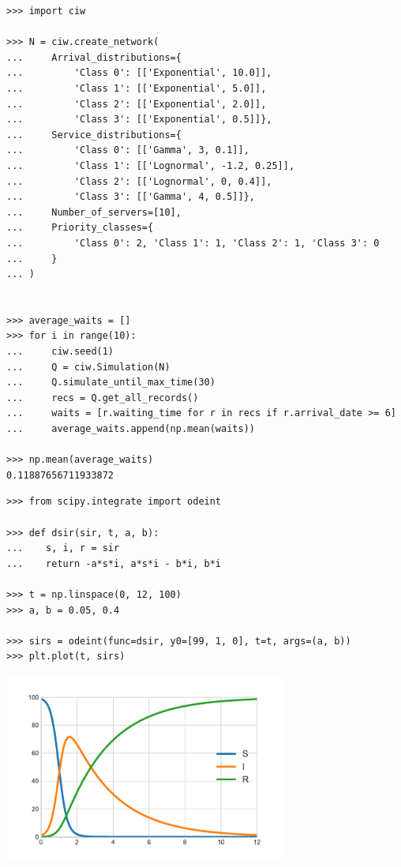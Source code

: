\documentclass{beamer}
\begin{document}
\begin{frame}[fragile]
\tiny{
\begin{verbatim}
>>> import ciw

>>> N = ciw.create_network(
...     Arrival_distributions={
...         'Class 0': [['Exponential', 10.0]],
...         'Class 1': [['Exponential', 5.0]],
...         'Class 2': [['Exponential', 2.0]],
...         'Class 3': [['Exponential', 0.5]]},
...     Service_distributions={
...         'Class 0': [['Gamma', 3, 0.1]],
...         'Class 1': [['Lognormal', -1.2, 0.25]],
...         'Class 2': [['Lognormal', 0, 0.4]],
...         'Class 3': [['Gamma', 4, 0.5]]},
...     Number_of_servers=[10],
...     Priority_classes={
...         'Class 0': 2, 'Class 1': 1, 'Class 2': 1, 'Class 3': 0
...     }
... )


>>> average_waits = []
>>> for i in range(10):
...     ciw.seed(1)
...     Q = ciw.Simulation(N)
...     Q.simulate_until_max_time(30)
...     recs = Q.get_all_records()
...     waits = [r.waiting_time for r in recs if r.arrival_date >= 6]
...     average_waits.append(np.mean(waits))

>>> np.mean(average_waits)
0.11887656711933872
\end{verbatim}
}
\end{frame}


\begin{frame}[fragile]
\scriptsize{
\begin{verbatim}
>>> from scipy.integrate import odeint

>>> def dsir(sir, t, a, b):
...    s, i, r = sir
...    return -a*s*i, a*s*i - b*i, b*i

>>> t = np.linspace(0, 12, 100)
>>> a, b = 0.05, 0.4

>>> sirs = odeint(func=dsir, y0=[99, 1, 0], t=t, args=(a, b))
>>> plt.plot(t, sirs)
\end{verbatim}
}
\begin{center}
  \includegraphics[width=0.7\textwidth]{SIR}
\end{center}
\end{frame}
\end{document}
